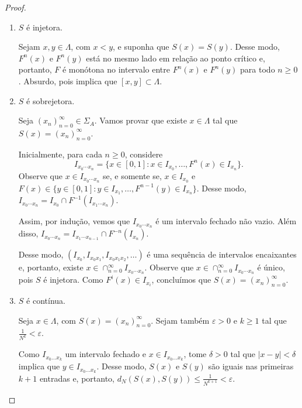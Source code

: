 \begin{proof}

\begin{enumerate}

\item $S$ é injetora.

Sejam $x, y \in \Lambda$, com $x < y$, e suponha que $S(x) = S(y)$. Desse modo, $F^n(x)$ e $F^n(y)$ está no mesmo lado em relação ao ponto crítico e, portanto, $F$ é monótona no intervalo entre $F^n(x)$ e $F^n(y)$ para todo $n \geq 0$. Absurdo, pois implica que $[x, y] \subset \Lambda$.

\item $S$ é sobrejetora.

Seja $(x_n)_{n=0}^\infty \in \Sigma_A$. Vamos provar que existe $x \in \Lambda$ tal que $S(x) = (x_n)_{n=0}^\infty$.

Inicialmente, para cada $n \geq 0$, considere
$$I_{x_0 \cdots x_n} = \{ x \in [0,1] : x \in I_{x_0}, \dots, F^n(x) \in I_{x_n} \}.$$
Observe que $x \in I_{x_0 \cdots x_n}$ se, e somente se, $x \in I_{x_0}$ e $F(x) \in \{ y \in [0,1] : y \in I_{x_1}, \dots, F^{n-1}(y) \in I_{x_n} \}$. Desse modo, $I_{x_0 \cdots x_n} = I_{x_0} \cap F^{-1}(I_{x_1 \cdots x_n})$.

Assim, por indução, vemos que $I_{x_0 \cdots x_n}$ é um intervalo fechado não vazio. Além disso, $I_{x_0 \cdots x_n} = I_{x_1 \cdots x_{n-1}} \cap F^{-n}(I_{x_n})$.

Desse modo, $(I_{x_0}, I_{x_0 x_1}, I_{x_0 x_1 x_2}, \dots)$ é uma sequência de intervalos encaixantes e, portanto, existe $x \in \cap_{n=0}^\infty I_{x_0 \cdots x_n}$. Observe que $x \in \cap_{n=0}^\infty I_{x_0 \cdots x_n}$ é único, pois $S$ é injetora. Como $F^i(x) \in I_{x_i}$, concluímos que $S(x) = (x_n)_{n=0}^\infty$.

\item $S$ é contínua.

Seja $x \in \Lambda$, com $S(x) = (x_n)_{n=0}^\infty$. Sejam também $\varepsilon > 0$ e $k \geq 1$ tal que $\frac{1}{N^k} < \varepsilon$.

Como $I_{x_0 \dots x_k}$ um intervalo fechado e $x \in I_{x_0 \dots x_k}$, tome $\delta > 0$ tal que $|x-y| < \delta$ implica que $y \in I_{x_0 \dots x_k}$. Desse modo, $S(x)$ e $S(y)$ são iguais nas primeiras $k+1$ entradas e, portanto, $d_N(S(x), S(y)) \leq \frac{1}{N^{k+1}} < \varepsilon$.

\end{enumerate}
\end{proof}


